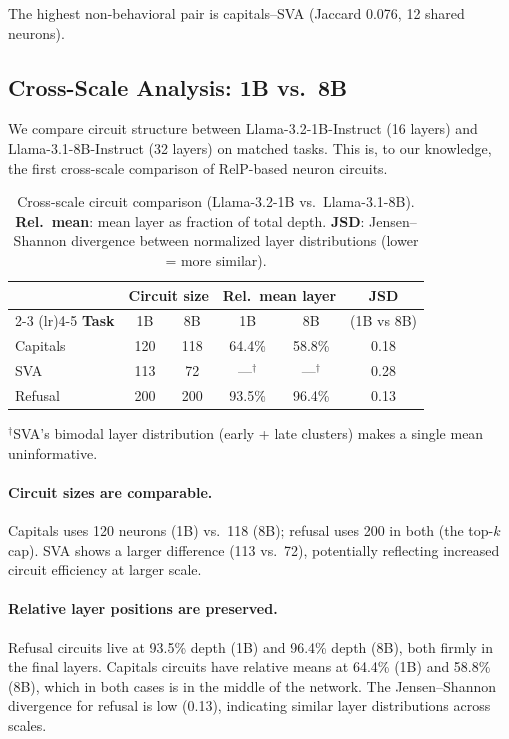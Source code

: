\documentclass[11pt]{article}
\begin{document}
The highest non-behavioral pair is capitals--SVA (Jaccard 0.076, 12 shared neurons).


\subsection{Cross-Scale Analysis: 1B vs.\ 8B}
\label{sec:cross_scale}

We compare circuit structure between Llama-3.2-1B-Instruct (16 layers) and Llama-3.1-8B-Instruct (32 layers) on matched tasks.
This is, to our knowledge, the first cross-scale comparison of RelP-based neuron circuits.

\begin{table}[htbp]
\centering
\caption{Cross-scale circuit comparison (Llama-3.2-1B vs.\ Llama-3.1-8B). \textbf{Rel.\ mean}: mean layer as fraction of total depth. \textbf{JSD}: Jensen--Shannon divergence between normalized layer distributions (lower = more similar).}
\label{tab:cross_scale}
\small
\begin{tabular}{lccccc}
\toprule
& \multicolumn{2}{c}{\textbf{Circuit size}} & \multicolumn{2}{c}{\textbf{Rel.\ mean layer}} & \textbf{JSD} \\
\cmidrule(lr){2-3} \cmidrule(lr){4-5}
\textbf{Task} & 1B & 8B & 1B & 8B & (1B vs 8B) \\
\midrule
Capitals & 120 & 118 & 64.4\% & 58.8\% & 0.18 \\
SVA      & 113 &  72 & ---$^\dagger$    & ---$^\dagger$    & 0.28 \\
Refusal  & 200 & 200 & 93.5\% & 96.4\% & 0.13 \\
\bottomrule
\end{tabular}
\vspace{2pt}

{\footnotesize $^\dagger$SVA's bimodal layer distribution (early + late clusters) makes a single mean uninformative.}
\end{table}

\paragraph{Circuit sizes are comparable.}
Capitals uses 120 neurons (1B) vs.\ 118 (8B); refusal uses 200 in both (the top-$k$ cap).
SVA shows a larger difference (113 vs.\ 72), potentially reflecting increased circuit efficiency at larger scale.

\paragraph{Relative layer positions are preserved.}
Refusal circuits live at 93.5\% depth (1B) and 96.4\% depth (8B), both firmly in the final layers.
Capitals circuits have relative means at 64.4\% (1B) and 58.8\% (8B), which in both cases is in the middle of the network.
The Jensen--Shannon divergence for refusal is low (0.13), indicating similar layer distributions across scales.
\end{document}

